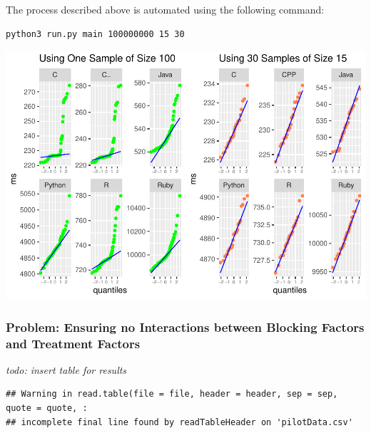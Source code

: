 \documentclass[12pt,halfline,a4paper,]{ouparticle}
\begin{document}
The process described above is automated using the following command:

\begin{verbatim}
python3 run.py main 100000000 15 30
\end{verbatim}

\includegraphics[width=1\linewidth,height=0.45\textheight]{skeleton_files/figure-latex/unnamed-chunk-1-1}

\subsubsection{Problem: Ensuring no Interactions between Blocking
Factors and Treatment
Factors}\label{problem-ensuring-no-interactions-between-blocking-factors-and-treatment-factors}

\emph{todo: insert table for results}

\begin{verbatim}
## Warning in read.table(file = file, header = header, sep = sep, quote = quote, :
## incomplete final line found by readTableHeader on 'pilotData.csv'
\end{verbatim}
\end{document}
